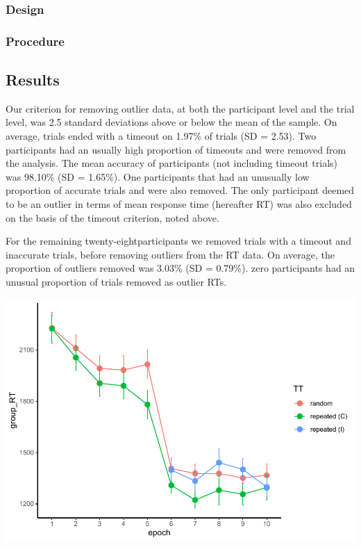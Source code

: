 \documentclass[
  man]{apa6}
\begin{document}
\hypertarget{design}{%
\subsubsection{Design}\label{design}}

\hypertarget{procedure}{%
\subsubsection{Procedure}\label{procedure}}

\hypertarget{results}{%
\subsection{Results}\label{results}}

Our criterion for removing outlier data, at both the participant level and the trial level, was 2.5 standard deviations above or below the mean of the sample. On average, trials ended with a timeout on 1.97\% of trials (SD = 2.53). Two participants had an usually high proportion of timeouts and were removed from the analysis. The mean accuracy of participants (not including timeout trials) was 98.10\% (SD = 1.65\%). One participants that had an unusually low proportion of accurate trials and were also removed. The only participant deemed to be an outlier in terms of mean response time (hereafter RT) was also excluded on the basis of the timeout criterion, noted above.

For the remaining twenty-eightparticipants we removed trials with a timeout and inaccurate trials, before removing outliers from the RT data. On average, the proportion of outliers removed was 3.03\% (SD = 0.79\%). zero participants had an unusual proportion of trials removed as outlier RTs.

\includegraphics{CCC_ms1_files/figure-latex/unnamed-chunk-5-1.pdf}
\end{document}
